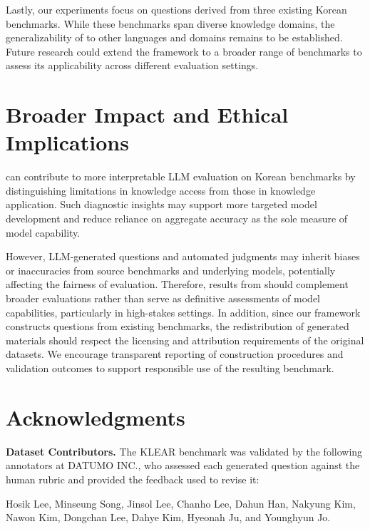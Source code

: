 Lastly, our experiments focus on questions derived from three existing Korean benchmarks.
While these benchmarks span diverse knowledge domains, the generalizability of \name{} to other languages and domains remains to be established.
Future research could extend the framework to a broader range of benchmarks to assess its applicability across different evaluation settings.

\section*{Broader Impact and Ethical Implications}
\name{} can contribute to more interpretable LLM evaluation on Korean benchmarks by distinguishing limitations in knowledge access from those in knowledge application.
Such diagnostic insights may support more targeted model development and reduce reliance on aggregate accuracy as the sole measure of model capability.

However, LLM-generated questions and automated judgments may inherit biases or inaccuracies from source benchmarks and underlying models, potentially affecting the fairness of evaluation.
Therefore, results from \name{} should complement broader evaluations rather than serve as definitive assessments of model capabilities, particularly in high-stakes settings.
In addition, since our framework constructs questions from existing benchmarks, the redistribution of generated materials should respect the licensing and attribution requirements of the original datasets.
We encourage transparent reporting of construction procedures and validation outcomes to support responsible use of the resulting benchmark.

\section*{Acknowledgments}

\noindent\textbf{Dataset Contributors.}
The KLEAR benchmark was validated by the following annotators at DATUMO INC., who assessed each generated question against the human rubric and provided the feedback used to revise it:

\noindent
Hosik Lee, Minseung Song, Jinsol Lee, Chanho Lee, Dahun Han, Nakyung Kim, Nawon Kim, Dongchan Lee, Dahye Kim, Hyeonah Ju, and Younghyun Jo.